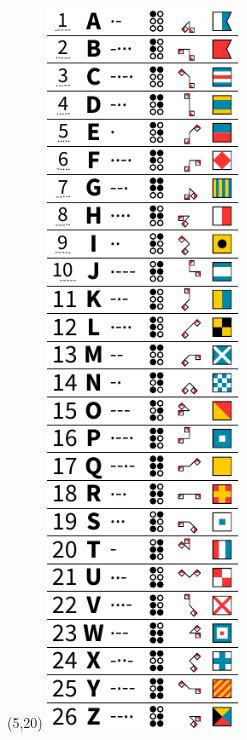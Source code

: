 \documentclass{extarticle}
\begin{document}
\begin{textblock}{0}(5,20)%
\vfill
{\includegraphics[height=190.5mm]{tools/main-narrow.pdf}}
\vfill
\end{textblock}
\end{document}

